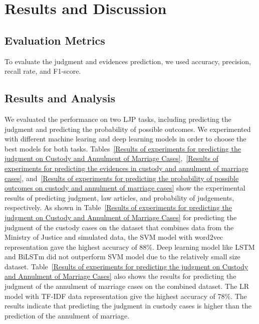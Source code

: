 \documentclass[sn-mathphys,Numbered]{sn-jnl}%
\theoremstyle{thmstyleone}%
\theoremstyle{thmstyletwo}%
\theoremstyle{thmstylethree}%
\begin{document}
\section{Results and Discussion}\label{sec:Dis}

 \subsection{Evaluation Metrics}
 To evaluate the judgment and evidences prediction, we used accuracy, precision, recall rate, and F1-score.
 \subsection{Results and Analysis}
 We evaluated the performance on two LJP tasks, including predicting the judgment and predicting the probability of possible outcomes. We experimented with different machine learing and deep learning models in order to choose the best models for both tasks. Tables~\ref{Results of experiments for predicting the judgment on Custody and Annulment of Marriage Cases},~\ref{Results of experiments for predicting the evidences in custody and annulment of marriage cases}, and~\ref{Results of experiments for predicting the probability of possible outcomes on custody and annulment of marriage cases} show the experimental results of predicting judgment, law articles, and probability of judgements, respectively. As shown in Table~\ref{Results of experiments for predicting the judgment on Custody and Annulment of Marriage Cases} for predicting the judgment of the custody cases on the dataset that combines data from the Ministry of Justice and simulated data, the SVM model with word2vec representation gave the highest accuracy of 88\%. Deep learning model like LSTM and BiLSTm did not outperform SVM model due to the relatively small size dataset. Table~\ref{Results of experiments for predicting the judgment on Custody and Annulment of Marriage Cases} also shows the results for predicting the judgment of the annulment of marriage cases on the combined dataset. The LR model with TF-IDF data representation give the highest accuracy of 78\%. %
 The results indicate that predicting the judgment in custody cases is higher than the prediction of the annulment of marriage. 
\end{document}
